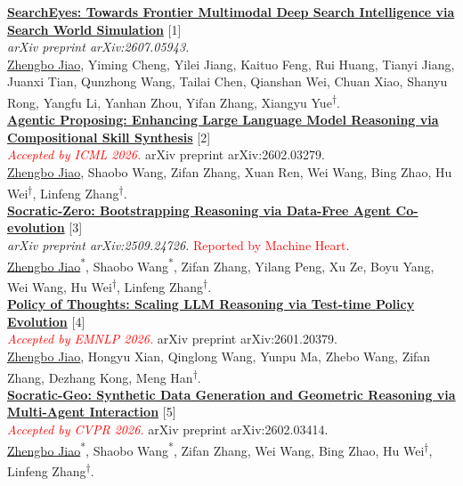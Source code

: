 \documentclass{resume}
\begin{document}
\noindent \href{https://arxiv.org/abs/2607.05943}{\textbf{SearchEyes: Towards Frontier Multimodal Deep Search Intelligence via Search World Simulation}} \hfill [1] \\
\textit{arXiv preprint arXiv:2607.05943.} \\
\underline{Zhengbo Jiao}, Yiming Cheng, Yilei Jiang, Kaituo Feng, Rui Huang, Tianyi Jiang, Juanxi Tian, Qunzhong Wang, Tailai Chen, Qianshan Wei, Chuan Xiao, Shanyu Rong, Yangfu Li, Yanhan Zhou, Yifan Zhang, Xiangyu Yue\textsuperscript{†}. \\

\noindent \href{https://arxiv.org/abs/2602.03279}{\textbf{Agentic Proposing: Enhancing Large Language Model Reasoning via Compositional Skill Synthesis}} \hfill [2]\\
\textit{\textcolor{red}{Accepted by ICML 2026.}} arXiv preprint arXiv:2602.03279. \\
\underline{Zhengbo Jiao}, Shaobo Wang, Zifan Zhang, Xuan Ren, Wei Wang, Bing Zhao, Hu Wei\textsuperscript{†}, Linfeng Zhang\textsuperscript{†}. \\

\noindent \href{https://arxiv.org/abs/2509.24726}{\textbf{Socratic-Zero: Bootstrapping Reasoning via Data-Free Agent Co-evolution}} \hfill [3] \\
\textit{arXiv preprint arXiv:2509.24726.} \textcolor{red}{Reported by Machine Heart}. \\
\underline{Zhengbo Jiao}\textsuperscript{*}, Shaobo Wang\textsuperscript{*}, Zifan Zhang, Yilang Peng, Xu Ze, Boyu Yang, Wei Wang, Hu Wei\textsuperscript{†}, Linfeng Zhang\textsuperscript{†}. \\

\noindent \href{https://arxiv.org/abs/2601.20379}{\textbf{Policy of Thoughts: Scaling LLM Reasoning via Test-time Policy Evolution}} \hfill [4]\\
\textit{\textcolor{red}{Accepted by EMNLP 2026.}} arXiv preprint arXiv:2601.20379. \\
\underline{Zhengbo Jiao}, Hongyu Xian, Qinglong Wang, Yunpu Ma, Zhebo Wang, Zifan Zhang, Dezhang Kong, Meng Han\textsuperscript{†}. \\

\noindent \href{https://arxiv.org/abs/2602.03414}{\textbf{Socratic-Geo: Synthetic Data Generation and Geometric Reasoning via Multi-Agent Interaction}} \hfill [5] \\
\textit{\textcolor{red}{Accepted by CVPR 2026.}} arXiv preprint arXiv:2602.03414. \\
\underline{Zhengbo Jiao}\textsuperscript{*}, Shaobo Wang\textsuperscript{*}, Zifan Zhang, Wei Wang, Bing Zhao, Hu Wei\textsuperscript{†}, Linfeng Zhang\textsuperscript{†}. \\
\end{document}
